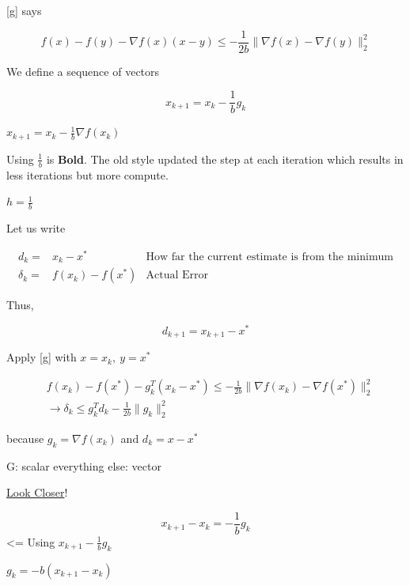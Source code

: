 \documentclass[11pt]{article}
\begin{document}
[g] says

$$
f(x) - f(y) - \nabla f(x) (x - y) \leq - \frac{1}{2b} \|\nabla f(x) - \nabla f(y)\|_2^2
$$

We define a sequence of vectors

$$x_{k + 1} = x_k - \frac{1}{b} g_k$$

\(x_{k + 1} = x_k - \frac{1}{b} \nabla f(x_k)\)

Using \(\frac{1}{b}\) is \textbf{Bold}. The old style updated the step at each iteration
which results in less iterations but more compute.

\(h = \frac{1}{b}\)

Let us write

\begin{equation}
\begin{split}
d_k = & x_k - x^* & \text{How far the current estimate is from the minimum}\\
\delta_k = & f(x_k) - f(x^*) & \text{Actual Error}
\end{split}
\end{equation}

Thus,

$$
d_{k + 1} = x_{k + 1} - x^*
$$

Apply [g] with \(x = x_k, \ y = x^*\)

\begin{equation}
\begin{split}
& f(x_k) - f(x^*) - g_k^T (x_k - x^*) \leq - \frac{1}{2b} \|\nabla f(x_k) - \nabla f(x^*)\|_2^2\\
& \to \delta_k \leq g_k^T d_k - \frac{1}{2b} \|g_k\|_2^2
\end{split}
\end{equation}

because \(g_k = \nabla f(x_k)\) and \(d_k = x - x^*\)

G: scalar
everything else: vector

\uline{Look Closer}!


$$x_{k + 1} - x_k = - \frac{1}{b} g_k$$ <= Using \(x_{k + 1} - \frac{1}{b} g_k\)

\(g_k = -b (x_{k + 1} - x_k)\)
\end{document}
